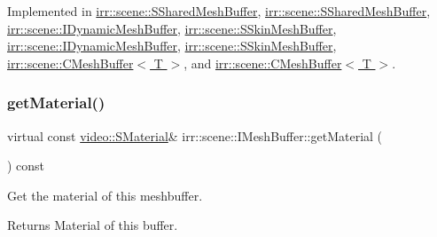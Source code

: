 Implemented in \hyperlink{structirr_1_1scene_1_1SSharedMeshBuffer_aea6a55293929329800d6299f86b65841}{irr\+::scene\+::\+S\+Shared\+Mesh\+Buffer}, \hyperlink{structirr_1_1scene_1_1SSharedMeshBuffer_aea6a55293929329800d6299f86b65841}{irr\+::scene\+::\+S\+Shared\+Mesh\+Buffer}, \hyperlink{classirr_1_1scene_1_1IDynamicMeshBuffer_a3be83e4819e9f79a3d9b264eb8bf4cfc}{irr\+::scene\+::\+I\+Dynamic\+Mesh\+Buffer}, \hyperlink{structirr_1_1scene_1_1SSkinMeshBuffer_a0ba6d4da9bbb92c5aa9c7c70225d3eb6}{irr\+::scene\+::\+S\+Skin\+Mesh\+Buffer}, \hyperlink{classirr_1_1scene_1_1IDynamicMeshBuffer_a3be83e4819e9f79a3d9b264eb8bf4cfc}{irr\+::scene\+::\+I\+Dynamic\+Mesh\+Buffer}, \hyperlink{structirr_1_1scene_1_1SSkinMeshBuffer_a0ba6d4da9bbb92c5aa9c7c70225d3eb6}{irr\+::scene\+::\+S\+Skin\+Mesh\+Buffer}, \hyperlink{classirr_1_1scene_1_1CMeshBuffer_a3e971800b0fc1a67134f839309589e43}{irr\+::scene\+::\+C\+Mesh\+Buffer$<$ T $>$}, and \hyperlink{classirr_1_1scene_1_1CMeshBuffer_a3e971800b0fc1a67134f839309589e43}{irr\+::scene\+::\+C\+Mesh\+Buffer$<$ T $>$}.

\mbox{\label{classirr_1_1scene_1_1IMeshBuffer_a341c1da2fd0cd556a15aab06d07dbbaa}} 
\subsubsection{\texorpdfstring{get\+Material()}{getMaterial()}\hspace{0.1cm}{\footnotesize\ttfamily [4/4]}}
{\footnotesize\ttfamily virtual const \hyperlink{classirr_1_1video_1_1SMaterial}{video\+::\+S\+Material}\& irr\+::scene\+::\+I\+Mesh\+Buffer\+::get\+Material (\begin{DoxyParamCaption}{ }\end{DoxyParamCaption}) const\hspace{0.3cm}{\ttfamily [pure virtual]}}



Get the material of this meshbuffer. 

\begin{DoxyReturn}{Returns}
Material of this buffer. 
\end{DoxyReturn}


